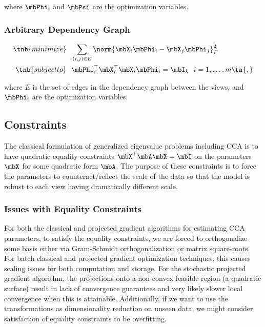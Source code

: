\documentclass{article}
\begin{document}
	\noindent where $\mbPhi_i$ and $\mbPsi$ are the optimization variables.

	\subsubsection{Arbitrary Dependency Graph} \label{subsubsec:arbdepgraph}
	
	\begin{align*}
		\tnb{minimize}&\ \ \sum_{(i,j) \in E}\norm{\mbX_i \mbPhi_i - \mbX_j \mbPhi_j}_F^2\\
		\tnb{subject to}&\ \  \mbPhi_i^{\top}\mbX_i^{\top}\mbX_i\mbPhi_i = \mbI_k\ \ i=1,\ldots,m \tn{,}
	\end{align*}
	
	\noindent where $E$ is the set of edges in the dependency graph between the views, and $\mbPhi_i$ are the optimization variables.
	
	\subsection{Constraints} \label{subsec:constraints}
	The classical formulation of generalized eigenvalue problems including CCA is to have quadratic equality constraints $\mbX^{\top}\mbA\mbX = \mbI$ on the parameters $\mbX$ for some quadratic form $\mbA$. The purpose of these constraints is to force the parameters to counteract/reflect the scale of the data so that the model is robust to each view having dramatically different scale.
	
	\subsubsection{Issues with Equality Constraints} \label{subsubsec:issueswithequality}
	For both the classical and projected gradient algorithms for estimating CCA parameters, to satisfy the equality constraints, we are forced to orthogonalize some basis either via Gram-Schmidt orthogonalization or matrix square-roots. For batch classical and projected gradient optimization techniques, this causes scaling issues for both computation and storage. For the stochastic projected gradient algorithm, the projections onto a non-convex feasible region (a quadratic surface) result in lack of convergence guarantees and very likely slower local convergence when this is attainable. Additionally, if we want to use the transformations as dimensionality reduction on unseen data, we might consider satisfaction of equality constraints to be overfitting.
	
\end{document}
